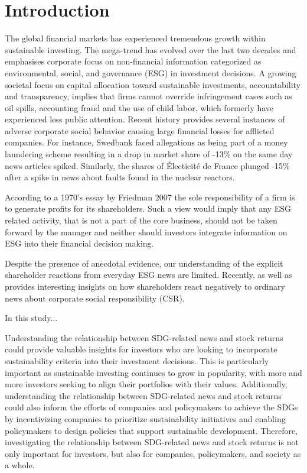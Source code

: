 \section{Introduction} \label{sec:intro}

The global financial markets has experienced tremendous growth within sustainable investing. The mega-trend has evolved over the last two decades and emphasises corporate focus on non-financial information categorized as environmental, social, and governance (ESG) in investment decisions. A growing societal focus on capital allocation toward sustainable investments, accountability and transparency, implies that firms cannot override infringement cases such as oil spills, accounting fraud and the use of child labor, which formerly have experienced less public attention. Recent history provides several instances of adverse corporate social behavior causing large financial losses for afflicted companies. For instance, Swedbank faced allegations as being part of a money laundering scheme resulting in a drop in market share of -13\% on the same day news articles spiked. Similarly, the shares of Électicité de France plunged -15\% after a spike in news about faults found in the nuclear reactors. 

According to a  1970’s essay by Friedman 2007 the sole responsibility of a firm is to generate profits for its shareholders. Such a view would imply that any ESG related activity, that is not a
part of the core business, should not be taken forward by the manager and neither should
investors integrate information on ESG into their financial decision making.

Despite the presence of anecdotal evidence, our understanding of the explicit shareholder reactions from everyday ESG news are limited. Recently, \cite{Blancard_ESG_sentiment} as well as \cite{kruger2015corporate} provides interesting insights on how shareholders react negatively to ordinary news about corporate social responsibility (CSR). 

In this study...





Understanding the relationship between SDG-related news and stock returns could provide valuable insights for investors who are looking to incorporate sustainability criteria into their investment decisions. This is particularly important as sustainable investing continues to grow in popularity, with more and more investors seeking to align their portfolios with their values. Additionally, understanding the relationship between SDG-related news and stock returns could also inform the efforts of companies and policymakers to achieve the SDGs by incentivizing companies to prioritize sustainability initiatives and enabling policymakers to design policies that support sustainable development. Therefore, investigating the relationship between SDG-related news and stock returns is not only important for investors, but also for companies, policymakers, and society as a whole.



